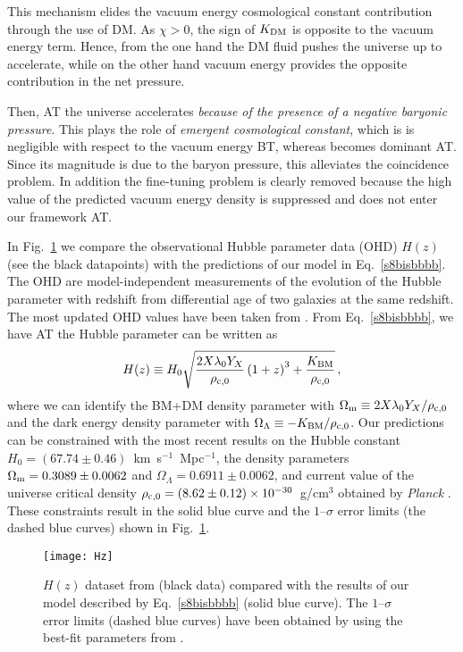 \documentclass[twocolumn,showpacs, nofootinbib,aps,superscriptaddress, eqsecnum,prd,prl,notitlepage,showkeys,10pt,reprint]{revtex4-1}
\begin{document}
This mechanism elides the vacuum energy cosmological constant contribution through the use of DM. As $\chi>0$, the sign of $K_{\rm DM}$ is opposite to the vacuum energy term. Hence, from the one hand the DM fluid pushes the universe up to accelerate, while on the other hand vacuum energy provides the opposite contribution in the net pressure.

Then, AT the universe accelerates \emph{because of the presence of a negative baryonic pressure}. This plays the role of \emph{emergent cosmological constant}, which is is negligible with respect to the vacuum energy BT, whereas becomes dominant AT. Since its magnitude is due to the baryon pressure, this alleviates the coincidence problem. In addition the fine-tuning problem is clearly removed because the high value of the predicted vacuum energy density is suppressed and does not enter our framework AT.

In Fig.~\ref{fig:1} we compare the observational Hubble parameter data (OHD) $H(z)$ (see the black datapoints) with the predictions of our model in Eq.~\eqref{s8bisbbbb}.
The OHD are model-independent measurements of the evolution of the Hubble parameter with redshift from differential age of two galaxies at the same redshift.
The most updated OHD values have been taken from \cite{2018MNRAS.476.3924C}.
From Eq.~\eqref{s8bisbbbb}, we have AT the Hubble parameter can be written as
%
\begin{equation}
\label{parOL}
H(z)\equiv H_0\sqrt{\frac{2X\lambda_0Y_X}{\rho_{\rm c,0}}\left(1+z\right)^3+\frac{K_{\rm BM}}{\rho_{\rm c,0}}}\,,
\end{equation}
%
where we can identify the BM+DM density parameter with $\Omega_{\rm m}\equiv 2X\lambda_0Y_X/\rho_{\rm c,0}$ and the dark energy density parameter with $\Omega_\Lambda\equiv -K_{\rm BM}/\rho_{\rm c,0}$. Our predictions can be constrained with the most recent results on the Hubble constant $H_0=(67.74\pm0.46)$~km~s$^{-1}$~Mpc$^{-1}$, the density parameters $\Omega_{\rm m}=0.3089\pm0.0062$ and $\Omega_\Lambda=0.6911\pm0.0062$, and current value of the universe critical density $\rho_{\rm c,0}=(8.62\pm0.12)\times10^{-30}$~g/cm$^3$ obtained by \textit{Planck} \cite{2016A&A...594A..13P}.
These constraints result in the solid blue curve and the $1$--$\sigma$ error limits (the dashed blue curves) shown in Fig.~\ref{fig:1}.
%
\begin{figure}
\centering
\texttt{[image: Hz]}
\caption{$H(z)$ dataset from \cite{2018MNRAS.476.3924C} (black data) compared with the results of our model described by Eq.~\eqref{s8bisbbbb} (solid blue curve). The $1$--$\sigma$ error limits (dashed blue curves) have been obtained by using the best-fit parameters from \cite{2016A&A...594A..13P}.}
\label{fig:1}
\end{figure}
\end{document}

